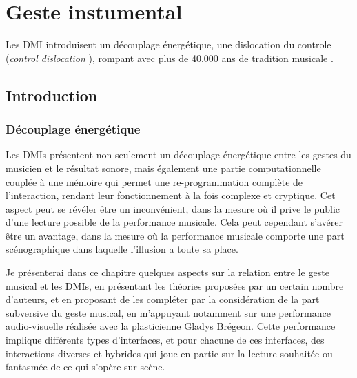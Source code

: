 %
\chapter{Geste instumental}
\label{ch:transparency}



Les DMI introduisent un découplage énergétique, une dislocation du controle (\textit{control dislocation} \cite{miranda_new_2006}), rompant avec plus de 40.000 ans de tradition musicale \cite{conard_new_2009}.

\section{Introduction}
\subsection{Découplage énergétique}

Les \glspl{DMI} présentent non seulement un découplage énergétique entre les gestes du musicien et le résultat sonore, mais également une partie computationnelle couplée à une mémoire qui permet une re-programmation complète de l'interaction, rendant leur fonctionnement à la fois complexe et cryptique. Cet aspect peut se révéler être un inconvénient, dans la mesure où il prive le public d’une lecture possible de la performance musicale. Cela peut cependant s’avérer être un avantage, dans la mesure où la performance musicale comporte une part scénographique dans laquelle l’illusion a toute sa place.

Je présenterai dans ce chapitre quelques aspects sur la relation entre le geste musical et les \glspl{DMI}, en présentant les théories proposées par un certain nombre d'auteurs, et en proposant de les compléter par la considération de la part subversive du geste musical, en m'appuyant notamment sur une performance audio-visuelle réalisée avec la plasticienne Gladys Brégeon. Cette performance implique différents types d’interfaces, et pour chacune de ces interfaces, des interactions diverses et hybrides qui joue en partie sur la lecture souhaitée ou fantasmée de ce qui s’opère sur scène.


